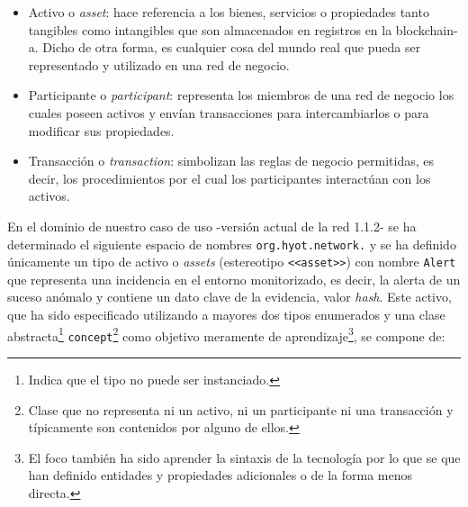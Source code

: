 \documentclass[12pt,a4paper, twoside]{report}
\begin{document}
	\begin{itemize}
		\item Activo o \textit{\gls{asset}}: hace referencia a los bienes, servicios o propiedades tanto tangibles como intangibles que son almacenados en registros en la \gls{blockchain-a}. Dicho de otra forma, es cualquier cosa del mundo real que pueda ser representado y utilizado en una red de negocio.
		\item Participante o \textit{\gls{participant}}: representa los miembros de una red de negocio los cuales poseen activos y envían transacciones para intercambiarlos o para modificar sus propiedades.
		\item Transacción o \textit{\gls{transaction}}: simbolizan las reglas de negocio permitidas, es decir, los procedimientos por el cual los participantes interactúan con los activos.
	\end{itemize}
	
	En el dominio de nuestro caso de uso -versión actual de la red 1.1.2- se ha determinado el siguiente espacio de nombres \texttt{org.hyot.network.} y se ha definido únicamente un tipo de activo o \textit{\glspl{asset}} (estereotipo \texttt{<<asset>>}) con nombre \texttt{Alert} que representa una incidencia en el entorno monitorizado, es decir, la alerta de un suceso anómalo y contiene un dato clave de la evidencia, valor \textit{hash}. Este activo, que ha sido especificado utilizando a mayores dos tipos enumerados y una clase abstracta\footnote{Indica que el tipo no puede ser instanciado.} \texttt{concept}\footnote{Clase que no representa ni un activo, ni un participante ni una transacción y típicamente son contenidos por alguno de ellos.} como objetivo meramente de aprendizaje\footnote{El foco también ha sido aprender la sintaxis de la tecnología por lo que se que han definido entidades y propiedades adicionales o de la forma menos directa.}, se compone de:
	
\end{document}
